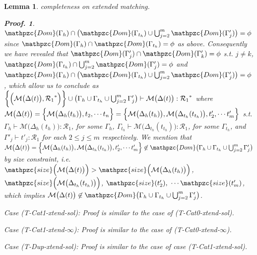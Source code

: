 \documentclass[12pt]{article}
\newtheorem{Lemma}{Lemma}[section]
\newtheorem{Proof}{Proof.}
\begin{document}
\begin{Lemma}{completeness on extended matching.}
\begin{Proof}
    $\mathpzc{Dom}(\Gamma_h) \cap \bigl(\mathpzc{Dom}(\Gamma_{t_h}) \cup
    \bigcup_{j=2}^m \mathpzc{Dom}(\Gamma'_j) \bigr) = \phi$ since
    $\mathpzc{Dom}(\Gamma_h) \cap \mathpzc{Dom}(\Gamma_{t_h}) = \phi$ as
    above. Consequently we have revealed that
    $\mathpzc{Dom}(\Gamma'_j) \cap \mathpzc{Dom}(\Gamma'_k) = \phi$ s.t.
    $j \neq k$,
    $\mathpzc{Dom}(\Gamma_{t_h}) \cap \bigcup_{j=2}^m \mathpzc{Dom}(
    \Gamma'_j) = \phi$ and
    $\mathpzc{Dom}(\Gamma_h) \cap \bigl(\mathpzc{Dom}(\Gamma_{t_h}) \cup
    \bigcup_{j=2}^m \mathpzc{Dom}(\Gamma'_j) \bigr) = \phi$, which
    allow us to conclude as
    $\biggl\{\Bigl(\mathcal{M}\bigl(\Delta(t) \bigr), {\mathcal{R}_1}^*
    \Bigr) \biggr\} \cup \bigl(\Gamma_h \cup \Gamma_{t_h} \cup
    \bigcup_{j=2}^m \Gamma'_j \bigr) \vdash
    \mathcal{M}\bigl(\Delta(t) \bigr) : {\mathcal{R}_1}^*$ where
    $\mathcal{M}\bigl(\Delta(t) \bigr) =
    \Bigl\{\mathcal{M}\bigl(\Delta_h(t_h) \bigr), t_2, \cdots t_n \Bigr\} =
    \Bigl\{\mathcal{M}\bigl(\Delta_h(t_h) \bigr),
    \mathcal{M}\bigl(\Delta_{t_h}(t_{t_h}) \bigr), t'_2, \cdots t'_m
    \Bigr\}$ s.t.
    $\Gamma_h \vdash \mathcal{M}\bigl(\Delta_h(t_h) \bigr) :
    \mathcal{R}_1$, for some $\Gamma_h$,
    $\Gamma_{t_h} \vdash \mathcal{M}\bigl(\Delta_{t_h}(t_{t_h}) \bigr) :
    \mathcal{R}_1$, for some $\Gamma_{t_h}$, and
    $\Gamma'_j \vdash t'_j : \mathcal{R}_1$ for each $2 \le j \le m$
    respectively. We mention that
    $\mathcal{M}\bigl(\Delta(t) \bigr) = \Bigl\{
    \mathcal{M}\bigl(\Delta_h(t_h) \bigr),
    \mathcal{M}\bigl(\Delta_{t_h}(t_{t_h}) \bigr), t'_2, \cdots t'_m
    \Bigr\} \not\in \mathpzc{Dom}\bigl(\Gamma_h \cup \Gamma_{t_h} \cup
    \bigcup_{j=2}^m \Gamma'_j \bigr)$ by size constraint, i.e.
    $\mathpzc{size}\Bigl(\mathcal{M}\bigl(\Delta(t) \bigr) \Bigr) >
    \mathpzc{size}\Bigl(\mathcal{M}\bigl(\Delta_h(t_h) \bigr) \Bigr)$,
    $\mathpzc{size}\Bigl(\mathcal{M}\bigl(\Delta_{t_h}(t_{t_h}) \bigr)
    \Bigr)$, $\mathpzc{size}(t'_2),\ \cdots \mathpzc{size}(t'_m)$, which
    implies $\mathcal{M}\bigl(\Delta(t) \bigr) \not\in \mathpzc{Dom}\bigl(
    \Gamma_h \cup \Gamma_{t_h} \cup \bigcup_{j=2}^m \Gamma'_j \bigr)$.
    
    Case (T-Cat1-xtend-sol):
    Proof is similar to the case of (T-Cat0-xtend-sol).
    
    Case (T-Cat1-xtend-$\infty$):
    Proof is similar to the case of (T-Cat0-xtend-$\infty$).
    
    Case (T-Dup-xtend-sol):
    Proof is similar to the case of case (T-Cat1-xtend-sol).
    

\end{Proof}
\end{Lemma}
\end{document}
